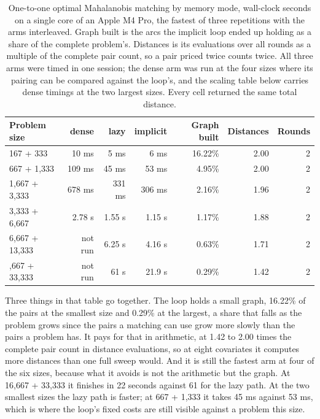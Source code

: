 \begin{table}

\caption{\label{tab:implicit-table}One-to-one optimal Mahalanobis matching by memory mode, wall-clock seconds on a single core of an Apple M4 Pro, the fastest of three repetitions with the arms interleaved. Graph built is the arcs the implicit loop ended up holding as a share of the complete problem's. Distances is its evaluations over all rounds as a multiple of the complete pair count, so a pair priced twice counts twice. All three arms were timed in one session; the dense arm was run at the four sizes where its pairing can be compared against the loop's, and the scaling table below carries dense timings at the two largest sizes. Every cell returned the same total distance.}
\centering
\begin{tabular}[t]{lrrrrrr}
\toprule
Problem size & dense & lazy & implicit & Graph built & Distances & Rounds\\
\midrule
167 + 333 & 10 ms & 5 ms & 6 ms & 16.22\% & 2.00 & 2\\
667 + 1,333 & 109 ms & 45 ms & 53 ms & 4.95\% & 2.00 & 2\\
1,667 + 3,333 & 678 ms & 331 ms & 306 ms & 2.16\% & 1.96 & 2\\
3,333 + 6,667 & 2.78 s & 1.55 s & 1.15 s & 1.17\% & 1.88 & 2\\
6,667 + 13,333 & not run & 6.25 s & 4.16 s & 0.63\% & 1.71 & 2\\
\addlinespace
16,667 + 33,333 & not run & 61 s & 21.9 s & 0.29\% & 1.42 & 2\\
\bottomrule
\end{tabular}
\end{table}

Three things in that table go together. The loop holds a small graph, 16.22\% of the pairs at the smallest size and 0.29\% at the largest, a
share that falls as the problem grows since the pairs a matching can use grow
more slowly than the pairs a problem has. It pays for that in arithmetic, at
1.42 to 2.00 times the complete pair count in distance
evaluations, so at eight covariates it computes more distances than one full
sweep would. And it is still the fastest arm at four of the six sizes, because
what it avoids is not the arithmetic but the graph. At
16,667 + 33,333 it finishes in
22 seconds against
61 for the lazy path. At the two
smallest sizes the lazy path is faster; at 667 + 1,333 it takes
45 ms against
53 ms, which is where the
loop's fixed costs are still visible against a problem this size.

